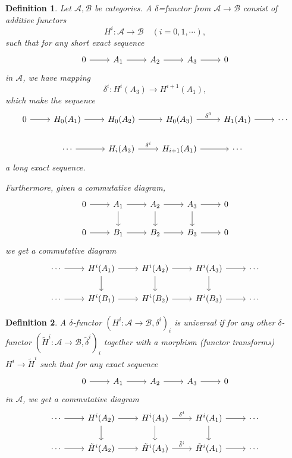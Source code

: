 \documentclass{article}
\newtheorem{definition}{Definition}[section]
\numberwithin{equation}{section}
\begin{document}
\begin{definition}
Let $\mathcal{A},\mathcal{B}$ be categories. A $\delta$=functor from $\mathcal{A}\to\mathcal{B}$ consist of additive functors
\begin{equation*}
H^i:\mathcal{A}\to\mathcal{B}\quad (i=0,1,\cdots),
\end{equation*}
such that for any short exact sequence
\[
\begin{tikzcd}
0\arrow[r]&A_1\arrow[r]&A_2\arrow[r]&A_3\arrow[r]&0
\end{tikzcd}
\]
in $\mathcal{A}$, we have mapping
\begin{equation*}
\delta^i:H^i(A_3)\to H^{i+1}(A_1),
\end{equation*}
which make the sequence
\[
\begin{tikzcd}
0 \arrow[r] & H_0(A_1) \arrow[r] & H_0(A_2) \arrow[r]             & H_0(A_3) \arrow[r, "\delta^0"] & H_1(A_1) \arrow[r] & \cdots \\
            & \cdots \arrow[r]   & H_i(A_3) \arrow[r, "\delta^i"] & H_{i+1}(A_1) \arrow[r]         & \cdots             &       
\end{tikzcd}
\]
a long exact sequence.\\
\par Furthermore, given a commutative diagram,
\[
\begin{tikzcd}
0 \arrow[r] & A_1 \arrow[r] \arrow[d] & A_2 \arrow[r] \arrow[d] & A_3 \arrow[r] \arrow[d] & 0 \\
0 \arrow[r] & B_1 \arrow[r]           & B_2 \arrow[r]           & B_3 \arrow[r]           & 0
\end{tikzcd}
\]
we get a commutative diagram
\[
\begin{tikzcd}
\cdots \arrow[r] & H^i(A_1) \arrow[r] \arrow[d] & H^i(A_2) \arrow[r] \arrow[d] & H^i(A_3) \arrow[r] \arrow[d] & \cdots \\
\cdots \arrow[r] & H^i(B_1) \arrow[r]           & H^i(B_2) \arrow[r]           & H^i(B_3) \arrow[r]           & \cdots
\end{tikzcd}
\]
\end{definition}

\begin{definition}
A $\delta$-functor $(H^i:\mathcal{A}\to\mathcal{B},\delta^i)_i$ is universal if for any other $\delta$-functor $(\tilde{H}^i:\mathcal{A}\to\mathcal{B},\tilde{\delta}^i)_i$ together with a morphism (functor transforms) $H^i\to\tilde{H}^i$ such that for any exact sequence
\[
\begin{tikzcd}
0 \arrow[r] & A_1 \arrow[r] & A_2 \arrow[r] & A_3 \arrow[r] & 0
\end{tikzcd}
\]
in $\mathcal{A}$, we get a commutative diagram
\[
\begin{tikzcd}
\cdots \arrow[r] & H^i(A_2) \arrow[r] \arrow[d] & H^i(A_3) \arrow[r, "\delta^i"] \arrow[d]       & H^i(A_1) \arrow[r] \arrow[d] & \cdots \\
\cdots \arrow[r] & \tilde{H}^i(A_2) \arrow[r]   & \tilde{H}^i(A_3) \arrow[r, "\tilde{\delta}^i"] & \tilde{H}^i(A_1) \arrow[r]   & \cdots
\end{tikzcd}
\]
\end{definition}
\end{document}
